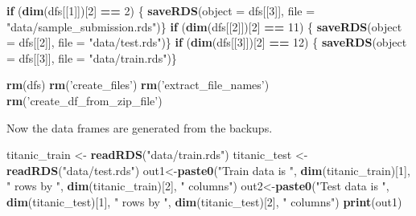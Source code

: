 \documentclass[]{article}
\newenvironment{Shaded}{\begin{snugshade}}{\end{snugshade}}
\newcommand{\ControlFlowTok}[1]{\textcolor[rgb]{0.13,0.29,0.53}{\textbf{#1}}}
\newcommand{\DataTypeTok}[1]{\textcolor[rgb]{0.13,0.29,0.53}{#1}}
\newcommand{\DecValTok}[1]{\textcolor[rgb]{0.00,0.00,0.81}{#1}}
\newcommand{\KeywordTok}[1]{\textcolor[rgb]{0.13,0.29,0.53}{\textbf{#1}}}
\newcommand{\NormalTok}[1]{#1}
\newcommand{\OperatorTok}[1]{\textcolor[rgb]{0.81,0.36,0.00}{\textbf{#1}}}
\newcommand{\StringTok}[1]{\textcolor[rgb]{0.31,0.60,0.02}{#1}}
\begin{document}
\begin{Shaded}
\begin{Highlighting}[]
\ControlFlowTok{if}\NormalTok{ (}\KeywordTok{dim}\NormalTok{(dfs[[}\DecValTok{1}\NormalTok{]])[}\DecValTok{2}\NormalTok{] }\OperatorTok{==}\StringTok{ }\DecValTok{2}\NormalTok{) \{ }\KeywordTok{saveRDS}\NormalTok{(}\DataTypeTok{object =}\NormalTok{ dfs[[}\DecValTok{3}\NormalTok{]], }\DataTypeTok{file =} \StringTok{"data/sample_submission.rds"}\NormalTok{)\}}
\ControlFlowTok{if}\NormalTok{ (}\KeywordTok{dim}\NormalTok{(dfs[[}\DecValTok{2}\NormalTok{]])[}\DecValTok{2}\NormalTok{] }\OperatorTok{==}\StringTok{ }\DecValTok{11}\NormalTok{) \{ }\KeywordTok{saveRDS}\NormalTok{(}\DataTypeTok{object =}\NormalTok{ dfs[[}\DecValTok{2}\NormalTok{]], }\DataTypeTok{file =} \StringTok{"data/test.rds"}\NormalTok{)\}}
\ControlFlowTok{if}\NormalTok{ (}\KeywordTok{dim}\NormalTok{(dfs[[}\DecValTok{3}\NormalTok{]])[}\DecValTok{2}\NormalTok{] }\OperatorTok{==}\StringTok{ }\DecValTok{12}\NormalTok{) \{ }\KeywordTok{saveRDS}\NormalTok{(}\DataTypeTok{object =}\NormalTok{ dfs[[}\DecValTok{3}\NormalTok{]], }\DataTypeTok{file =} \StringTok{"data/train.rds"}\NormalTok{)\}}

\KeywordTok{rm}\NormalTok{(dfs)}
\KeywordTok{rm}\NormalTok{(}\StringTok{'create_files'}\NormalTok{)}
\KeywordTok{rm}\NormalTok{(}\StringTok{'extract_file_names'}\NormalTok{)}
\KeywordTok{rm}\NormalTok{(}\StringTok{'create_df_from_zip_file'}\NormalTok{)}
\end{Highlighting}
\end{Shaded}

Now the data frames are generated from the backups.

\begin{Shaded}
\begin{Highlighting}[]
\NormalTok{titanic_train <-}\StringTok{ }\KeywordTok{readRDS}\NormalTok{(}\StringTok{"data/train.rds"}\NormalTok{)}
\NormalTok{titanic_test <-}\StringTok{ }\KeywordTok{readRDS}\NormalTok{(}\StringTok{"data/test.rds"}\NormalTok{)}
\NormalTok{out1<-}\KeywordTok{paste0}\NormalTok{(}\StringTok{"Train data is "}\NormalTok{, }\KeywordTok{dim}\NormalTok{(titanic_train)[}\DecValTok{1}\NormalTok{], }\StringTok{" rows by "}\NormalTok{, }\KeywordTok{dim}\NormalTok{(titanic_train)[}\DecValTok{2}\NormalTok{], }\StringTok{" columns"}\NormalTok{)}
\NormalTok{out2<-}\KeywordTok{paste0}\NormalTok{(}\StringTok{"Test data is "}\NormalTok{, }\KeywordTok{dim}\NormalTok{(titanic_test)[}\DecValTok{1}\NormalTok{], }\StringTok{" rows by "}\NormalTok{, }\KeywordTok{dim}\NormalTok{(titanic_test)[}\DecValTok{2}\NormalTok{], }\StringTok{" columns"}\NormalTok{)}
\KeywordTok{print}\NormalTok{(out1)}
\end{Highlighting}
\end{Shaded}
\end{document}
